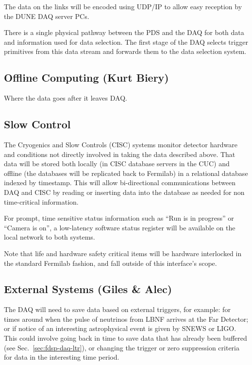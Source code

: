 The data on the links will be encoded using UDP/IP to allow easy
reception by the DUNE DAQ server PCs.

There is a single physical pathway between the PDS and the DAQ for
both data and information used for data selection. The first stage of
the DAQ selects trigger primitives from this data stream and forwards
them to the data selection system.

\subsection{Offline Computing (Kurt Biery)}
\label{sec:fdsp-daq-intfc-fnal-cmptg}

Where the data goes after it leaves DAQ.

\subsection{Slow Control}
\label{sec:fdsp-daq-intfc-ext}

The Cryogenics and Slow Controls (CISC) systems monitor detector
hardware and conditions not directly involved in taking the data
described above.  That data will be stored both locally (in CISC
database servers in the CUC) and offline (the databases will be
replicated back to Fermilab) in a relational database indexed by
timestamp.  This will allow bi-directional communications between DAQ
and CISC by reading or inserting data into the database as needed for
non time-critical information.  

For prompt, time sensitive status information such as ``Run is in
progress'' or ``Camera is on'', a low-latency software status register
will be available on the local network to both systems.

Note that life and hardware safety critical items will be hardware
interlocked in the standard Fermilab fashion, and fall outside of this
interface's scope.


\subsection{External Systems (Giles \& Alec)}
\label{sec:fdsp-daq-intfc-ext}


The DAQ will need to save data based on external triggers, for example:
for times around when the pulse of neutrinos from LBNF arrives at the
Far Detector; or if notice of an interesting astrophysical event is
given by SNEWS\cite{snews} or LIGO.  This could involve going back in
time to save data that has already been buffered (see
Sec.~\ref{sec:fdsp-daq-ltr}), or changing the trigger or zero
suppression criteria for data in the interesting time period.


